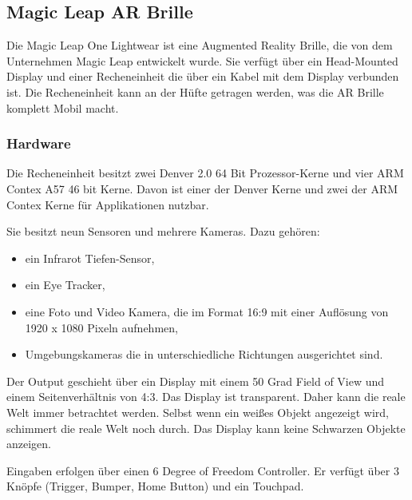 \subsection{Magic Leap AR Brille}

Die Magic Leap One Lightwear ist eine Augmented Reality Brille, die von dem Unternehmen Magic Leap entwickelt wurde. Sie verfügt über ein Head-Mounted Display und einer Recheneinheit die über ein Kabel mit dem Display verbunden ist. Die Recheneinheit kann an der Hüfte getragen werden, was die AR Brille komplett Mobil macht. 


\subsubsection{Hardware}

Die Recheneinheit besitzt zwei Denver 2.0 64 Bit Prozessor-Kerne und vier ARM Contex A57 46 bit Kerne. Davon ist einer der Denver Kerne und zwei der ARM Contex Kerne für Applikationen nutzbar.  

Sie besitzt neun Sensoren und mehrere Kameras. Dazu gehören:
\begin{itemize}
	\item ein Infrarot Tiefen-Sensor,
	\item ein Eye Tracker,
	\item eine Foto und Video Kamera, die im Format 16:9 mit einer Auflösung von 1920 x 1080 Pixeln aufnehmen,
	\item Umgebungskameras die in unterschiedliche Richtungen ausgerichtet sind. \citep{mlofficialsalespitch,mlglossary}
\end{itemize}

Der Output geschieht über ein Display mit einem 50 Grad Field of View und einem Seitenverhältnis von 4:3. Das Display ist transparent. Daher kann die reale Welt immer betrachtet werden. Selbst wenn ein weißes Objekt angezeigt wird, schimmert die reale Welt noch durch. 
Das Display kann keine Schwarzen Objekte anzeigen. 

Eingaben erfolgen über einen 6 Degree of Freedom Controller. Er verfügt über 3 Knöpfe (Trigger, Bumper, Home Button) und ein Touchpad. \citep{mlofficialsalespitch,mlglossary}

